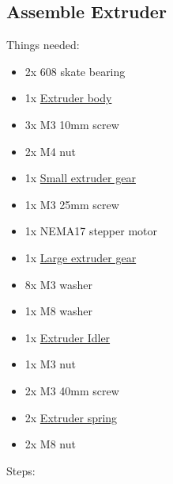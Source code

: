 \documentclass[11pt]{article}
\begin{document}
\subsection{Assemble Extruder}
Things needed:
\begin{itemize}
\item 2x 608 skate bearing
\item 1x \hyperlink{thing_extruder-body}{Extruder body}
\item 3x M3 10mm screw
\item 2x M4 nut
\item 1x \hyperlink{thing_small-gear}{Small extruder gear}
\item 1x M3 25mm screw
\item 1x NEMA17 stepper motor
\item 1x \hyperlink{thing_large-gear}{Large extruder gear}
\item 8x M3 washer
\item 1x M8 washer
\item 1x \hyperlink{thing_idler}{Extruder Idler}
\item 1x M3 nut
\item 2x M3 40mm screw
\item 2x \hyperlink{thing_extruder-spring}{Extruder spring}
\item 2x M8 nut
\end{itemize}
Steps:
\end{document}

